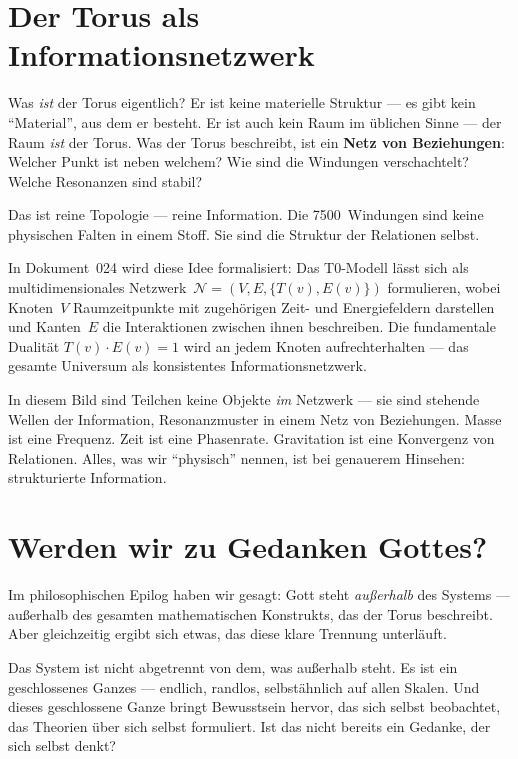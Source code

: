 \section{Der Torus als Informationsnetzwerk}

Was \emph{ist} der Torus eigentlich? Er ist keine materielle Struktur --- es gibt kein \enquote{Material}, aus dem er besteht. Er ist auch kein Raum im üblichen Sinne --- der Raum \emph{ist} der Torus. Was der Torus beschreibt, ist ein \textbf{Netz von Beziehungen}: Welcher Punkt ist neben welchem? Wie sind die Windungen verschachtelt? Welche Resonanzen sind stabil?

Das ist reine Topologie --- reine Information. Die 7500~Windungen sind keine physischen Falten in einem Stoff. Sie sind die Struktur der Relationen selbst.

In Dokument~024 wird diese Idee formalisiert: Das T0-Modell lässt sich als multidimensionales Netzwerk~$\mathcal{N} = (V, E, \{T(v), E(v)\})$ formulieren, wobei Knoten~$V$ Raumzeitpunkte mit zugehörigen Zeit- und Energiefeldern darstellen und Kanten~$E$ die Interaktionen zwischen ihnen beschreiben. Die fundamentale Dualität $T(v) \cdot E(v) = 1$ wird an jedem Knoten aufrechterhalten --- das gesamte Universum als konsistentes Informationsnetzwerk.

In diesem Bild sind Teilchen keine Objekte \emph{im} Netzwerk --- sie sind stehende Wellen der Information, Resonanzmuster in einem Netz von Beziehungen. Masse ist eine Frequenz. Zeit ist eine Phasenrate. Gravitation ist eine Konvergenz von Relationen. Alles, was wir \enquote{physisch} nennen, ist bei genauerem Hinsehen: strukturierte Information.

\section{Werden wir zu Gedanken Gottes?}

Im philosophischen Epilog haben wir gesagt: Gott steht \emph{außerhalb} des Systems --- außerhalb des gesamten mathematischen Konstrukts, das der Torus beschreibt. Aber gleichzeitig ergibt sich etwas, das diese klare Trennung unterläuft.

Das System ist nicht abgetrennt von dem, was außerhalb steht. Es ist ein geschlossenes Ganzes --- endlich, randlos, selbstähnlich auf allen Skalen. Und dieses geschlossene Ganze bringt Bewusstsein hervor, das sich selbst beobachtet, das Theorien über sich selbst formuliert. Ist das nicht bereits ein Gedanke, der sich selbst denkt?

